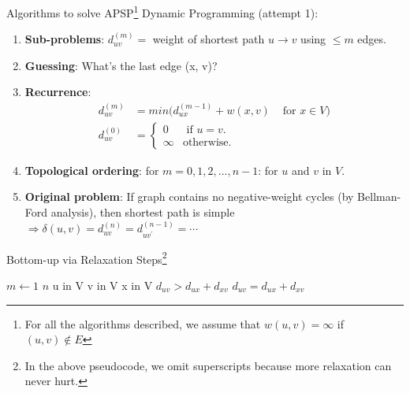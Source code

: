 \documentclass[aspectratio=169]{beamer}
\begin{document}
\begin{frame}{Algorithms to solve APSP\footnote{\scriptsize For all the algorithms described, we assume that $w(u, v) = \infty$ if $(u, v) \notin E$}}
    Dynamic Programming (attempt 1):
    \begin{enumerate}
    \scriptsize
        \item \textbf{Sub-problems}: $d_{uv}^{(m)} =$ weight of shortest path $u \rightarrow v$ using $\leq m$ edges. \pause
        \item \textbf{Guessing}: What's the last edge (x, v)? \pause
        \item \textbf{Recurrence}:
        \begin{equation*}
            \begin{align*}
                d_{uv}^{(m)} &= min( d_{ux}^{(m - 1)} + w(x, v) & \text{ for } x \in V) \\
                d_{uv}^{(0)} &=
                    \begin{cases}
                        0 & \text{ if } u = v. \\
                        \infty & \text{otherwise}.
                    \end{cases}
            \end{align*}
        \end{equation*} \pause
        \item \textbf{Topological ordering}: for $m = 0, 1, 2, . . . , n - 1$: for $u$ and $v$ in $V$. \pause
        \item \textbf{Original problem}: If graph contains no negative-weight cycles (by Bellman-Ford analysis), then shortest path is simple $\Rightarrow \delta(u, v) = d_{uv}^{(n)} = d_{uv^\prime}^{(n - 1)} = \cdots$
    \end{enumerate}
\end{frame}

\begin{frame}{Bottom-up via Relaxation Steps\footnote{{\scriptsize In the above pseudocode, we omit superscripts because more relaxation can never hurt.}}}
    \begin{codebox}
        \li \For $m \gets 1$ \To $n$ 
        \li \hspace{0.5cm} \For u in V
        \li \hspace{1.0cm} \For v in V
        \li \hspace{1.5cm} \For x in V
        \li \hspace{2.0cm} \If $d_{uv} > d_{ux} + d_{xv}$
        \li \hspace{2.5cm} $d_{uv} = d_{ux} + d_{xv}$
    \end{codebox}
\end{frame}
\end{document}
